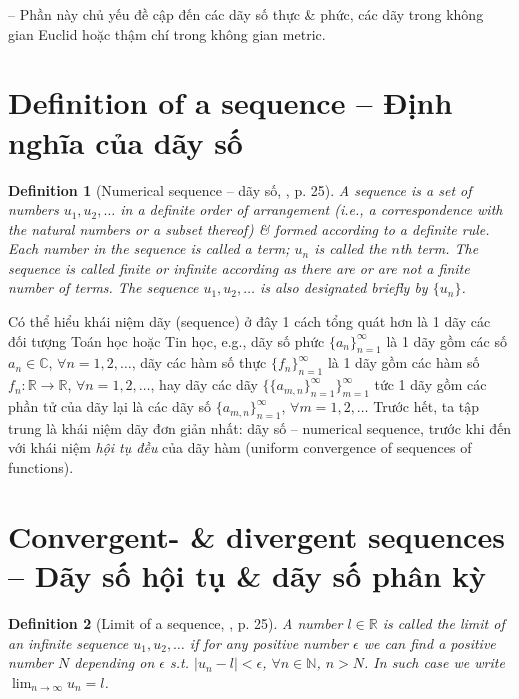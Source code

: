 \documentclass[oneside]{book}
\newtheorem{definition}{Definition}
\begin{document}
-- Phần này chủ yếu đề cập đến các dãy số thực \& phức, các dãy trong không gian Euclid hoặc thậm chí trong không gian metric.


\section{Definition of a sequence -- Định nghĩa của dãy số}

\begin{definition}[Numerical sequence -- dãy số, \cite{Wrede_Spiegel2010}, p. 25]
	A {\rm sequence} is a set of numbers $u_1,u_2,\ldots$ in a definite order of arrangement (i.e., a {\rm correspondence} with the natural numbers or a subset thereof) \& formed according to a definite rule. Each number in the sequence is called a {\rm term}; $u_n$ is called the {\rm$n$th term}. The sequence is called {\rm finite} or {\rm infinite} according as there are or are not a finite number of terms. The sequence $u_1,u_2,\ldots$ is also designated briefly by $\{u_n\}$.
\end{definition}
Có thể hiểu khái niệm dãy (sequence) ở đây 1 cách tổng quát hơn là 1 dãy các đối tượng Toán học hoặc Tin học, e.g., dãy số phức $\{a_n\}_{n=1}^\infty$ là 1 dãy gồm các số $a_n\in\mathbb{C}$, $\forall n = 1,2,\ldots$, dãy các hàm số thực $\{f_n\}_{n=1}^\infty$ là 1 dãy gồm các hàm số $f_n:\mathbb{R}\to\mathbb{R}$, $\forall n = 1,2,\ldots$, hay dãy các dãy $\{\{a_{m,n}\}_{n=1}^\infty\}_{m=1}^\infty$ tức 1 dãy gồm các phần tử của dãy lại là các dãy số $\{a_{m,n}\}_{n=1}^\infty$, $\forall m = 1,2,\ldots$ Trước hết, ta tập trung là khái niệm dãy đơn giản nhất: dãy số -- numerical sequence, trước khi đến với khái niệm {\it hội tụ đều} của dãy hàm (uniform convergence of sequences of functions).


\section{Convergent- \& divergent sequences -- Dãy số hội tụ \& dãy số phân kỳ}

\begin{definition}[Limit of a sequence, \cite{Wrede_Spiegel2010}, p. 25]
	A number $l\in\mathbb{R}$ is called the {\rm limit} of an infinite sequence $u_1,u_2,\ldots$ if for any positive number $\epsilon$ we can find a positive number $N$ depending on $\epsilon$ s.t. $|u_n - l| < \epsilon$, $\forall n\in\mathbb{N}$, $n > N$. In such case we write $\lim_{n\to\infty} u_n = l$.
\end{definition}
\end{document}
